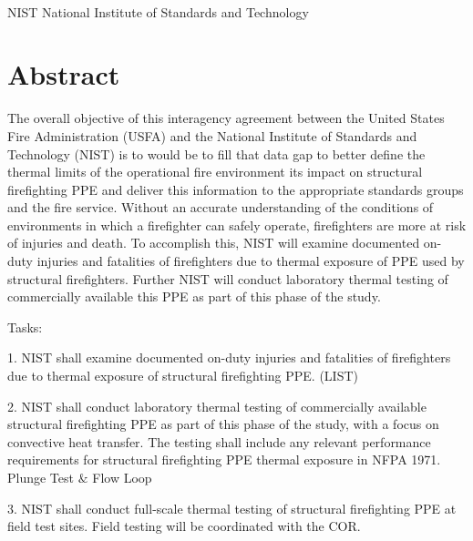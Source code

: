 \documentclass[12pt,oneside]{book}
\begin{document}
\begin{tabbing}
\hspace{1.5in} \= \\
NIST \> National Institute of Standards and Technology \\
\end{tabbing}

\mainmatter

\chapter*{\centering Abstract}
The overall objective of this interagency agreement between the United States Fire Administration (USFA) and the National Institute of Standards and Technology (NIST) is to would be to fill that data gap to better define the thermal limits of the operational fire environment its impact on structural firefighting PPE and deliver this information to the appropriate standards groups and the fire service.  Without an accurate understanding of the conditions of environments in which a firefighter can safely operate, firefighters are more at risk of injuries and death.
To accomplish this, NIST will examine documented on-duty injuries and fatalities of firefighters due to thermal exposure of PPE used by structural firefighters.  Further NIST will conduct laboratory thermal testing of commercially available this PPE as part of this phase of the study.

Tasks:

1.	NIST shall examine documented on-duty injuries and fatalities of firefighters due to thermal exposure of structural firefighting PPE.    (LIST)

2.	NIST shall conduct laboratory thermal testing of commercially available structural firefighting PPE as part of this phase of the study, with a focus on convective heat transfer.  The testing shall include any relevant performance requirements for structural firefighting PPE thermal exposure in NFPA 1971.   Plunge Test $\&$ Flow Loop

3.	NIST shall conduct full-scale thermal testing of structural firefighting PPE at field test sites.  Field testing will be coordinated with the COR.
\end{document}
